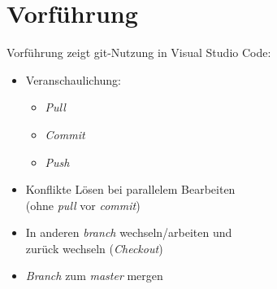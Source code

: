 \section{Vorführung}
\begin{frame}
Vorführung zeigt git-Nutzung in Visual Studio Code:
\begin{itemize}
\item Veranschaulichung:
\begin{itemize}
\item \emph{Pull}
\item \emph{Commit}
\item \emph{Push}
\end{itemize}
\item Konflikte Lösen bei parallelem Bearbeiten\\
(ohne \emph{pull} vor \emph{commit})
\item In anderen \emph{branch} wechseln/arbeiten und\\
zurück wechseln (\emph{Checkout})
\item \emph{Branch} zum \emph{master} mergen
\end{itemize}
\end{frame}

